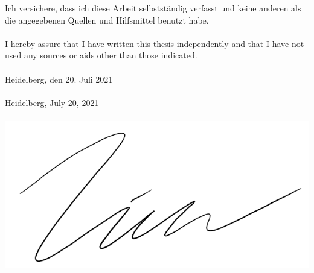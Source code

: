 Ich versichere, dass ich diese Arbeit selbstst\"{a}ndig verfasst und keine anderen als die angegebenen Quellen und Hilfsmittel benutzt habe.
\\\\
\noindent I hereby assure that I have written this thesis independently and that I have not used any sources or aids other than those indicated.
\\\\
\noindent Heidelberg, den 20. Juli 2021
\\\\
\noindent Heidelberg, July 20, 2021
\\\\
\includegraphics[width=.5\textwidth]{Chapters/figures/unterschrift.PNG}

